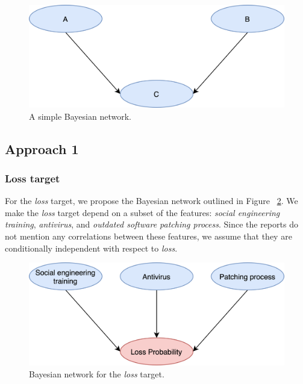 \begin{figure}[h!]
	\center
	\includegraphics[scale=0.63]{images/synthetic/bayesian.png}
	\caption{\label{fig:bayesian} A simple Bayesian network.}
\end{figure}

\subsection{Approach 1}

\subsubsection{Loss target}

For the \textit{loss} target, we propose the Bayesian network outlined in Figure ~\ref{fig:bayesian-easy}. We make the \textit{loss} target depend on a subset of the features: \textit{social engineering training}, \textit{antivirus}, and \textit{outdated software patching process}. Since the reports do not mention any correlations between these features, we assume that they are conditionally independent with respect to \textit{loss}.

\begin{figure}[h!]
	\center
	\includegraphics[scale=0.63]{images/synthetic/bayesian_easy}
	\caption{\label{fig:bayesian-easy} Bayesian network for the \textit{loss} target.}
\end{figure}

